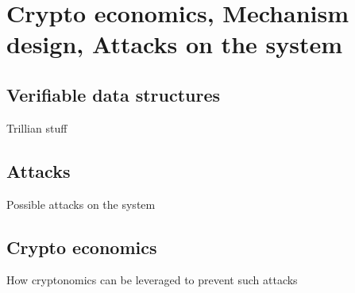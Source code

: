 \section{Crypto economics, Mechanism design, Attacks on the system}
\subsection{Verifiable data structures}
Trillian stuff
\subsection{Attacks}
Possible attacks on the system
\subsection{Crypto economics}
How cryptonomics can be leveraged to prevent such attacks
